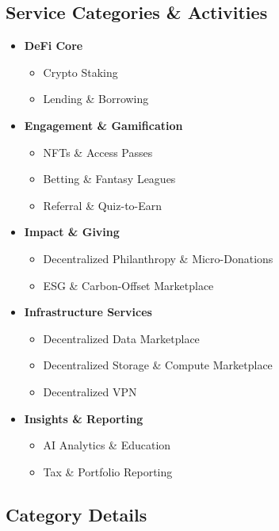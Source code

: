 \documentclass[13pt]{extarticle}
\begin{document}
\subsection{Service Categories \& Activities}
\begin{itemize}[left=1em]
  \item \textbf{DeFi Core}
    \begin{itemize}[left=1.2em]
      \item Crypto Staking
      \item Lending \& Borrowing
    \end{itemize}

  \item \textbf{Engagement \& Gamification}
    \begin{itemize}[left=1.2em]
      \item NFTs \& Access Passes
      \item Betting \& Fantasy Leagues
      \item Referral \& Quiz-to-Earn
    \end{itemize}

  \item \textbf{Impact \& Giving}
    \begin{itemize}[left=1.2em]
      \item Decentralized Philanthropy \& Micro-Donations
      \item ESG \& Carbon-Offset Marketplace
    \end{itemize}

  \item \textbf{Infrastructure Services}
    \begin{itemize}[left=1.2em]
      \item Decentralized Data Marketplace
      \item Decentralized Storage \& Compute Marketplace
      \item Decentralized VPN
    \end{itemize}

  \item \textbf{Insights \& Reporting}
    \begin{itemize}[left=1.2em]
      \item AI Analytics \& Education
      \item Tax \& Portfolio Reporting
    \end{itemize}
\end{itemize}

\subsection{Category Details}
\end{document}
